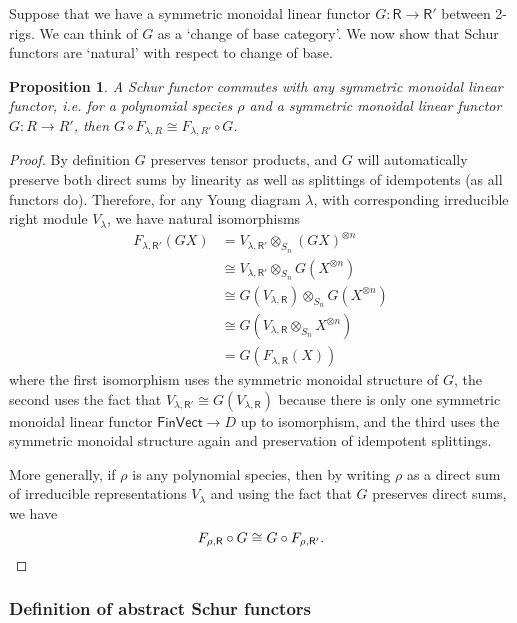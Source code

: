 \documentclass[12pt,reqno]{amsart}
\theoremstyle{plain}
\newtheorem{prop}[thm]{Proposition}
\theoremstyle{definition}
\theoremstyle{remark}
\newcommand{\maps}{\colon}
\newcommand{\category}[1]{\mathsf{#1}}
\newcommand{\R}{\category R}
\newcommand{\namedcat}[1]{\mathsf{#1}}
\newcommand{\Vect}{\namedcat{Vect}}
\newcommand{\Fin}{\namedcat{Fin}}
\numberwithin{thm}{section}
\begin{document}
Suppose that we have a symmetric monoidal linear functor $G \maps \R \to \R'$ between 2-rigs. We can think of $G$ as a `change of base category'. We now show that Schur functors are `natural' with respect to change of base. 

\begin{prop} 
\label{prop:Schurnatural}
    A Schur functor commutes with any symmetric monoidal linear functor, i.e. for a polynomial species $\rho$ and a symmetric monoidal linear functor $G \colon R \to R'$, then $G \circ F_{\lambda, R} \cong F_{\lambda, R'} \circ G$.
\end{prop}

\begin{proof}
    By definition $G$ preserves tensor products, and $G$ will automatically preserve both direct sums by linearity as well as splittings of idempotents (as all functors do). Therefore, for any Young diagram $\lambda$, with corresponding irreducible right module $V_\lambda$, we have natural isomorphisms 
    \begin{align*}
        F_{\lambda, \R'} (G X) & = V_{\lambda, \R'} \otimes_{S_n} (G X)^{\otimes n} \\
        & \cong V_{\lambda, \R'} \otimes_{S_n} G(X^{\otimes n}) \\
        & \cong G(V_{\lambda, \R}) \otimes_{S_n} G(X^{\otimes n}) \\
        & \cong G(V_{\lambda, \R} \otimes_{S_n} X^{\otimes n}) \\
        & = G(F_{\lambda, \R}(X))
    \end{align*} 
    where the first isomorphism uses the symmetric monoidal structure of $G$, the second uses the fact that $V_{\lambda, \R'} \cong G(V_{\lambda, \R})$ because there is only one symmetric monoidal linear functor $\Fin\Vect \to D$ up to isomorphism, and the third uses the symmetric monoidal structure again and preservation of idempotent splittings. 
    
    More generally, if $\rho$ is any polynomial species, then by writing $\rho$ as a direct sum of irreducible representations $V_\lambda$ and using the fact that $G$ preserves direct sums, we have 
    \[
        F_{\rho, \R} \circ G \cong G \circ F_{\rho, \R'}.\qedhere
    \]
\end{proof}

\subsubsection{Definition of abstract Schur functors}
\end{document}
